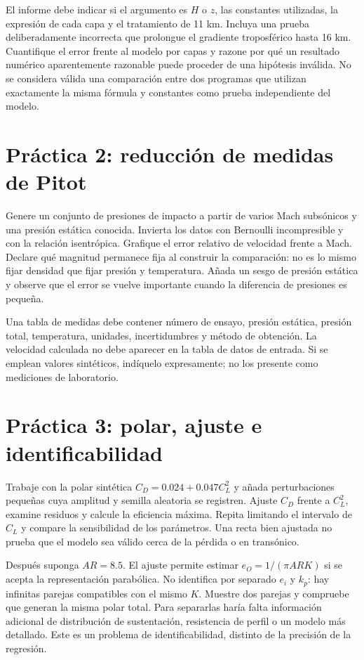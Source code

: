 El informe debe indicar si el argumento es $H$ o $z$, las constantes utilizadas, la expresión de cada capa y el tratamiento de 11 km. Incluya una prueba deliberadamente incorrecta que prolongue el gradiente troposférico hasta 16 km. Cuantifique el error frente al modelo por capas y razone por qué un resultado numérico aparentemente razonable puede proceder de una hipótesis inválida. No se considera válida una comparación entre dos programas que utilizan exactamente la misma fórmula y constantes como prueba independiente del modelo.

\section{Práctica 2: reducción de medidas de Pitot}
Genere un conjunto de presiones de impacto a partir de varios Mach subsónicos y una presión estática conocida. Invierta los datos con Bernoulli incompresible y con la relación isentrópica. Grafique el error relativo de velocidad frente a Mach. Declare qué magnitud permanece fija al construir la comparación: no es lo mismo fijar densidad que fijar presión y temperatura. Añada un sesgo de presión estática y observe que el error se vuelve importante cuando la diferencia de presiones es pequeña.

Una tabla de medidas debe contener número de ensayo, presión estática, presión total, temperatura, unidades, incertidumbres y método de obtención. La velocidad calculada no debe aparecer en la tabla de datos de entrada. Si se emplean valores sintéticos, indíquelo expresamente; no los presente como mediciones de laboratorio.

\section{Práctica 3: polar, ajuste e identificabilidad}
Trabaje con la polar sintética $C_D=0.024+0.047C_L^2$ y añada perturbaciones pequeñas cuya amplitud y semilla aleatoria se registren. Ajuste $C_D$ frente a $C_L^2$, examine residuos y calcule la eficiencia máxima. Repita limitando el intervalo de $C_L$ y compare la sensibilidad de los parámetros. Una recta bien ajustada no prueba que el modelo sea válido cerca de la pérdida o en transónico.

Después suponga $AR=8.5$. El ajuste permite estimar $e_O=1/(\pi ARK)$ si se acepta la representación parabólica. No identifica por separado $e_i$ y $k_p$: hay infinitas parejas compatibles con el mismo $K$. Muestre dos parejas y compruebe que generan la misma polar total. Para separarlas haría falta información adicional de distribución de sustentación, resistencia de perfil o un modelo más detallado. Este es un problema de identificabilidad, distinto de la precisión de la regresión.

